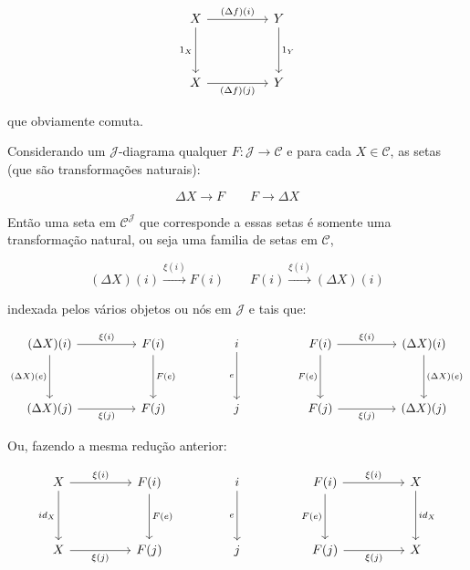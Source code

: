 \documentclass[../main.tex]{subfiles}
\begin{document}
\[\begin{tikzcd}
	X && Y \\
	\\
	X && Y
	\arrow["{(\Delta f)(i)}", from=1-1, to=1-3]
	\arrow["{1_X}"', from=1-1, to=3-1]
	\arrow["{1_Y}", from=1-3, to=3-3]
	\arrow["{(\Delta f)(j)}"', from=3-1, to=3-3]
\end{tikzcd}\]

que obviamente comuta.

Considerando um $\mathcal{J}$-diagrama qualquer $F : \mathcal{J} \to \mathcal{C}$ e para cada $X \in \mathcal{C}$, as setas (que são transformações naturais):

$$\Delta X \to F \quad\quad F \to \Delta X$$

Então uma seta em $\mathcal{C}^{\mathcal{J}}$ que corresponde a essas setas é somente uma transformação natural, ou seja uma familia de setas em $\mathcal{C}$,

$$(\Delta X)(i) \xrightarrow{\xi (i)} F(i) \quad\quad F(i) \xrightarrow{\xi (i)} (\Delta X)(i)$$

indexada pelos vários objetos ou nós em $\mathcal{J}$ e tais que:

\[\begin{tikzcd}
	{(\Delta X)(i)} && {F(i)} && i && {F(i)} && {(\Delta X)(i)} \\
	\\
	{(\Delta X)(j)} && {F(j)} && j && {F(j)} && {(\Delta X)(j)}
	\arrow["{\xi (i)}", from=1-1, to=1-3]
	\arrow["{(\Delta X)(e)}"', from=1-1, to=3-1]
	\arrow["{F(e)}", from=1-3, to=3-3]
	\arrow["e"', from=1-5, to=3-5]
	\arrow["{\xi (i)}", from=1-7, to=1-9]
	\arrow["{F(e)}"', from=1-7, to=3-7]
	\arrow["{(\Delta X)(e)}", from=1-9, to=3-9]
	\arrow["{\xi(j)}"', from=3-1, to=3-3]
	\arrow["{\xi (j)}"', from=3-7, to=3-9]
\end{tikzcd}\]

Ou, fazendo a mesma redução anterior:

\[\begin{tikzcd}
	X && {F(i)} && i && {F(i)} && X \\
	\\
	X && {F(j)} && j && {F(j)} && X
	\arrow["{\xi (i)}", from=1-1, to=1-3]
	\arrow["{id_X}"', from=1-1, to=3-1]
	\arrow["{F(e)}", from=1-3, to=3-3]
	\arrow["e"', from=1-5, to=3-5]
	\arrow["{\xi (i)}", from=1-7, to=1-9]
	\arrow["{F(e)}"', from=1-7, to=3-7]
	\arrow["{id_X}", from=1-9, to=3-9]
	\arrow["{\xi(j)}"', from=3-1, to=3-3]
	\arrow["{\xi (j)}"', from=3-7, to=3-9]
\end{tikzcd}\]
\end{document}
